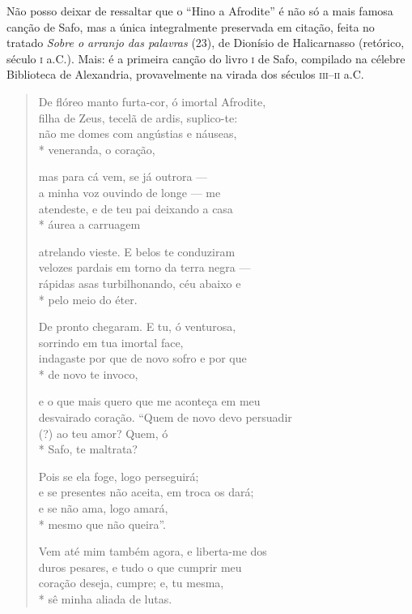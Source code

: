 {Não posso deixar de ressaltar que o “Hino a Afrodite” é não só
a mais famosa canção de Safo, mas a única integralmente preservada em citação, feita no tratado \textit{Sobre o arranjo das palavras} (23), de Dionísio de Halicarnasso (retórico, século \textsc{i} a.C.). Mais: é a primeira canção do livro \textsc{i} de Safo,
compilado na célebre Biblioteca de Alexandria, provavelmente na virada dos
séculos \textsc{iii}--\textsc{ii} a.C.}

\begin{verse}
De flóreo manto furta-cor, ó imortal Afrodite,\\
filha de Zeus, tecelã de ardis, suplico-te:\\
não me domes com angústias e náuseas,\\*
veneranda, o coração,

mas para cá vem, se já outrora ---\\
a minha voz ouvindo de longe --- me\\
atendeste, e de teu pai deixando a casa\\*
áurea a carruagem

atrelando vieste. E belos te conduziram\\
velozes pardais em torno da terra negra ---\\
rápidas asas turbilhonando, céu abaixo e\\*
pelo meio do éter.

De pronto chegaram. E tu, ó venturosa,\\
sorrindo em tua imortal face,\\
indagaste por que de novo sofro e por que\\*
de novo te invoco,

e o que mais quero que me aconteça em meu\\
desvairado coração. “Quem de novo devo persuadir\\
(?) ao teu amor? Quem, ó\\*
Safo, te maltrata?

Pois se ela foge, logo perseguirá;\\
e se presentes não aceita, em troca os dará;\\
e se não ama, logo amará,\\*
mesmo que não queira”.

Vem até mim também agora, e liberta-me dos\\
duros pesares, e tudo o que cumprir meu\\
coração deseja, cumpre; e, tu mesma,\\*
sê minha aliada de lutas.
\end{verse}

